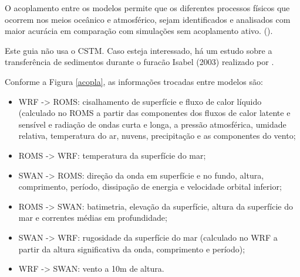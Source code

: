 \noindent O acoplamento entre os modelos permite que os diferentes processos físicos que ocorrem nos meios oceânico e atmosférico, 
          sejam identificados e analisados com maior acurácia em comparação com simulações sem acoplamento ativo. (\cite{Pullen2018, Miller2018}).
\bigskip

\begin{tcolorbox}[enhanced,
  grow to left by   = 0cm,
  grow to right by  = 0cm,
  enlarge top by    = 0cm,
  enlarge bottom by = 0cm,
  tcbox raise base,
  boxrule           = 1.0pt,
  left              = 18mm,
  colframe          = red!50!black,coltext=red!25!black,colback=red!10!white,
  overlay           = {\begin{tcbclipinterior}\fill[red!75!blue!50!white] (frame.south west)
    rectangle node[text=white,font=\sffamily\bfseries\footnotesize,rotate=0] {ATENÇÃO} ([xshift=18mm]frame.north west);\end{tcbclipinterior}}]
Este guia não usa o CSTM. Caso esteja interessado, há um estudo sobre a transferência de sedimentos durante o furacão Isabel (2003) realizado por \textcite{Warner2010}.
\end{tcolorbox}
\bigskip


\noindent Conforme a Figura \textcolor{bleu_cite}{\ref{acopla}}, as informações trocadas entre modelos são:
\bigskip

\begin{itemize}
\item WRF -> ROMS: cisalhamento de superfície e fluxo de calor líquido (calculado no ROMS a partir das componentes dos fluxos de calor latente e sensível e radiação de ondas curta e longa, a pressão atmosférica, umidade relativa, temperatura do ar, nuvens, precipitação e as componentes do vento;
\item ROMS -> WRF: temperatura da superfície do mar;
\item SWAN -> ROMS: direção da onda em superfície e no fundo, altura, comprimento, período, dissipação de energia e velocidade orbital inferior;
\item ROMS -> SWAN: batimetria, elevação da superfície, altura da superfície do mar e correntes médias em profundidade;
\item SWAN -> WRF: rugosidade da superfície do mar (calculado no WRF a partir da altura significativa da onda, comprimento e período);
\item WRF -> SWAN: vento a 10m de altura.
\end{itemize}
\bigskip

